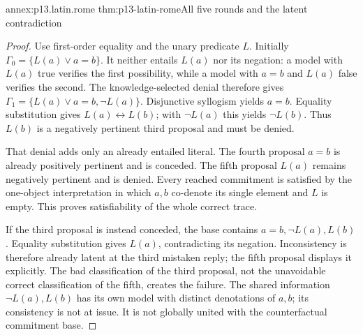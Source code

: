 \begin{annexitem}{annex:p13.latin.rome}
 {thm:p13-latin-rome}{All five rounds and the latent contradiction}
\begin{proof}
Use first-order equality and the unary predicate \(L\).
Initially \(\Gamma_0=\{L(a)\lor a=b\}\).
It neither entails \(L(a)\) nor its negation:
a model with \(L(a)\) true verifies the first possibility, while
a model with \(a=b\) and \(L(a)\) false verifies the second.
The knowledge-selected denial therefore gives
\(\Gamma_1=\{L(a)\lor a=b,\neg L(a)\}\).
Disjunctive syllogism yields \(a=b\).
Equality substitution gives \(L(a)\leftrightarrow L(b)\);
with \(\neg L(a)\) this yields \(\neg L(b)\).
Thus \(L(b)\) is a negatively pertinent third proposal and must be denied.

That denial adds only an already entailed literal.
The fourth proposal \(a=b\) is already positively pertinent and is conceded.
The fifth proposal \(L(a)\) remains negatively pertinent and is denied.
Every reached commitment is satisfied by the one-object interpretation
in which \(a,b\) co-denote its single element and \(L\) is empty.
This proves satisfiability of the whole correct trace.

If the third proposal is instead conceded, the base contains
\(a=b,\neg L(a),L(b)\). Equality substitution gives \(L(a)\),
contradicting its negation. Inconsistency is therefore already latent
at the third mistaken reply; the fifth proposal displays it explicitly.
The bad classification of the third proposal, not the unavoidable
correct classification of the fifth, creates the failure.
The shared information \(\neg L(a),L(b)\) has its own model with distinct
denotations of \(a,b\); its consistency is not at issue.
It is not globally united with the counterfactual commitment base.
\end{proof}
\end{annexitem}

